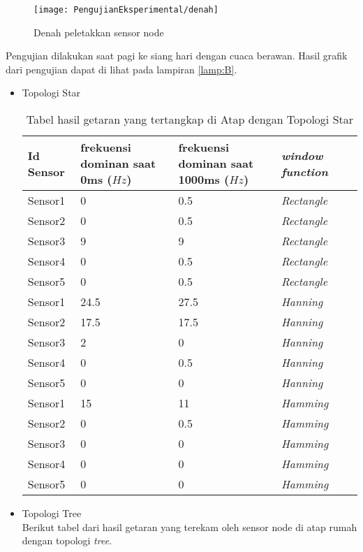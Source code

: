 \begin{figure}[H]
	\centering
	\texttt{[image: PengujianEksperimental/denah]}  
	\caption[Denah peletakkan sensor node]{Denah peletakkan sensor node} 
	\label{fig:PengujianEksperimentaldenah} 
\end{figure}

Pengujian dilakukan saat pagi ke siang hari dengan cuaca berawan. Hasil grafik dari pengujian dapat di lihat pada lampiran \ref{lamp:B}.

\begin{itemize}
\item Topologi Star\\
\begin{table}[H]
    \centering
    \caption{Tabel hasil getaran yang tertangkap di Atap dengan Topologi Star}
    \begin{tabular}{|p{3cm}|p{3cm}|p{3cm}|p{3cm}|p{3cm}|}
    \hline Id Sensor & frekuensi dominan saat 0ms ($Hz$)& frekuensi dominan saat 1000ms ($Hz$)& {\it window function}\\
    \hline Sensor1 & 0& 0.5 & {\it Rectangle} \\
    \hline Sensor2 & 0& 0.5 & {\it Rectangle} \\
    \hline Sensor3 & 9 & 9 & {\it Rectangle} \\
    \hline Sensor4 & 0 & 0.5 & {\it Rectangle} \\
    \hline Sensor5 & 0 & 0.5 & {\it Rectangle} \\
    \hline Sensor1 & 24.5& 27.5 & {\it Hanning} \\
    \hline Sensor2 & 17.5 &17.5 & {\it Hanning} \\
    \hline Sensor3 &2 & 0& {\it Hanning} \\
    \hline Sensor4 & 0& 0.5& {\it Hanning} \\
    \hline Sensor5 &0 & 0& {\it Hanning} \\
    \hline Sensor1 & 15& 11& {\it Hamming} \\
    \hline Sensor2 &0 & 0.5 & {\it Hamming} \\
    \hline Sensor3 &0 &0 & {\it Hamming} \\
    \hline Sensor4 &0 &0 & {\it Hamming} \\
    \hline Sensor5 &0 &0 & {\it Hamming} \\
    \hline
    \end{tabular}
    \label{tab:starAtapResult}
\end{table}

\item Topologi Tree\\
Berikut tabel dari hasil getaran yang terekam oleh sensor node di atap rumah dengan topologi {\it tree}.


\end{itemize}
